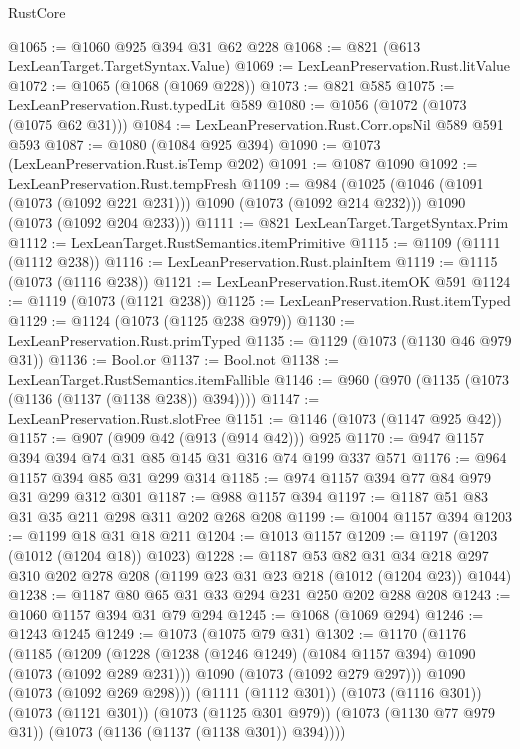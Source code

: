 \begin{lexlean}{RustCore}
\begin{coremodule}
@1065 := @1060 @925 @394 @31 @62 @228
@1068 := @821 (@613 LexLeanTarget.TargetSyntax.Value)
@1069 := LexLeanPreservation.Rust.litValue
@1072 := @1065 (@1068 (@1069 @228))
@1073 := @821 @585
@1075 := LexLeanPreservation.Rust.typedLit @589
@1080 := @1056 (@1072 (@1073 (@1075 @62 @31)))
@1084 := LexLeanPreservation.Rust.Corr.opsNil @589 @591 @593
@1087 := @1080 (@1084 @925 @394)
@1090 := @1073 (LexLeanPreservation.Rust.isTemp @202)
@1091 := @1087 @1090
@1092 := LexLeanPreservation.Rust.tempFresh
@1109 := @984
    (@1025
      (@1046 (@1091 (@1073 (@1092 @221 @231))) @1090 (@1073 (@1092 @214 @232)))
      @1090
      (@1073 (@1092 @204 @233)))
@1111 := @821 LexLeanTarget.TargetSyntax.Prim
@1112 := LexLeanTarget.RustSemantics.itemPrimitive
@1115 := @1109 (@1111 (@1112 @238))
@1116 := LexLeanPreservation.Rust.plainItem
@1119 := @1115 (@1073 (@1116 @238))
@1121 := LexLeanPreservation.Rust.itemOK @591
@1124 := @1119 (@1073 (@1121 @238))
@1125 := LexLeanPreservation.Rust.itemTyped
@1129 := @1124 (@1073 (@1125 @238 @979))
@1130 := LexLeanPreservation.Rust.primTyped
@1135 := @1129 (@1073 (@1130 @46 @979 @31))
@1136 := Bool.or
@1137 := Bool.not
@1138 := LexLeanTarget.RustSemantics.itemFallible
@1146 := @960 (@970 (@1135 (@1073 (@1136 (@1137 (@1138 @238)) @394))))
@1147 := LexLeanPreservation.Rust.slotFree
@1151 := @1146 (@1073 (@1147 @925 @42))
@1157 := @907 (@909 @42 (@913 (@914 @42))) @925
@1170 := @947 @1157 @394 @394 @74 @31 @85 @145 @31 @316 @74 @199 @337 @571
@1176 := @964 @1157 @394 @85 @31 @299 @314
@1185 := @974 @1157 @394 @77 @84 @979 @31 @299 @312 @301
@1187 := @988 @1157 @394
@1197 := @1187 @51 @83 @31 @35 @211 @298 @311 @202 @268 @208
@1199 := @1004 @1157 @394
@1203 := @1199 @18 @31 @18 @211
@1204 := @1013 @1157
@1209 := @1197 (@1203 (@1012 (@1204 @18)) @1023)
@1228 := @1187
    @53
    @82
    @31
    @34
    @218
    @297
    @310
    @202
    @278
    @208
    (@1199 @23 @31 @23 @218 (@1012 (@1204 @23)) @1044)
@1238 := @1187 @80 @65 @31 @33 @294 @231 @250 @202 @288 @208
@1243 := @1060 @1157 @394 @31 @79 @294
@1245 := @1068 (@1069 @294)
@1246 := @1243 @1245
@1249 := @1073 (@1075 @79 @31)
@1302 := @1170
    (@1176
      (@1185
        (@1209
          (@1228
            (@1238 (@1246 @1249) (@1084 @1157 @394) @1090 (@1073 (@1092 @289 @231)))
            @1090
            (@1073 (@1092 @279 @297)))
          @1090
          (@1073 (@1092 @269 @298)))
        (@1111 (@1112 @301))
        (@1073 (@1116 @301))
        (@1073 (@1121 @301))
        (@1073 (@1125 @301 @979))
        (@1073 (@1130 @77 @979 @31))
        (@1073 (@1136 (@1137 (@1138 @301)) @394))))

\end{coremodule}
\end{lexlean}
